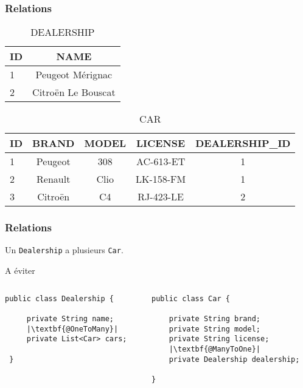 \documentclass[t,12pt]{beamer}
\begin{document}
\begin{frame}[t]
	\frametitle{Relations}

	\begin{table}
		\caption{DEALERSHIP}
		\begin{tabular}{l | c}
			ID & NAME \\
			\hline
			1 & Peugeot M\'erignac \\
			2 & Citro\"en Le Bouscat
		\end{tabular}
	\end{table}

	\begin{table}
		\caption{CAR}
		\begin{tabular}{l | c | c | c | c}
			ID & BRAND & MODEL & LICENSE & DEALERSHIP\_ID \\
			\hline
			1 & Peugeot & 308 & AC-613-ET & 1 \\
			2 & Renault & Clio & LK-158-FM  & 1 \\
			3 & Citro\"en & C4 &  RJ-423-LE & 2
		\end{tabular}
	\end{table}
\end{frame}

\begin{frame}[fragile]
	\frametitle{Relations}

	Un \lstinline{Dealership} a plusieurs \lstinline{Car}.

	\begin{alertblock}{A \'eviter}
		\begin{columns}
			\begin{column}{0.45\textwidth}
				\begin{lstlisting}[frame=none]
 public class Dealership {

     private String name;
     |\textbf{@OneToMany}|
     private List<Car> cars;

 }
				\end{lstlisting}
			\end{column}
			\vrule{}
			\begin{column}{0.55\textwidth}
				\begin{lstlisting}[frame=none]
public class Car {

    private String brand;
    private String model;
    private String license;
    |\textbf{@ManyToOne}|
    private Dealership dealership;

}
				\end{lstlisting}
			\end{column}
		\end{columns}
	\end{alertblock}
\end{frame}
\end{document}
